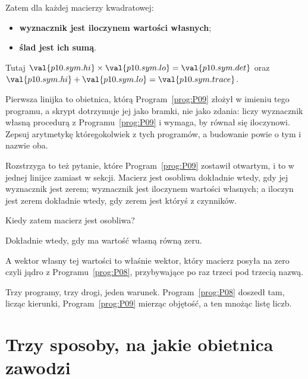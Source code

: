 \begin{fr}
Zatem dla każdej macierzy kwadratowej:

\begin{itemize}
\item \textbf{wyznacznik jest iloczynem wartości własnych};
\item \textbf{ślad jest ich sumą}.
\end{itemize}

Tutaj $\val{p10.sym.hi} \times \val{p10.sym.lo} = \val{p10.sym.det}$ oraz
$\val{p10.sym.hi} + \val{p10.sym.lo} = \val{p10.sym.trace}$.

Pierwsza linijka to obietnica, którą Program~\ref{prog:P09} złożył w imieniu
tego programu, a skrypt dotrzymuje jej jako bramki, nie jako zdania: liczy
wyznacznik własną procedurą z Programu~\ref{prog:P09} i wymaga, by równał się
iloczynowi. Zepsuj arytmetykę któregokolwiek z tych programów, a budowanie
powie o tym i nazwie oba.

Rozstrzyga to też pytanie, które Program~\ref{prog:P09} zostawił otwartym, i to
w jednej linijce zamiast w sekcji. Macierz jest osobliwa dokładnie wtedy, gdy
jej wyznacznik jest zerem; wyznacznik jest iloczynem wartości własnych; a
iloczyn jest zerem dokładnie wtedy, gdy zerem jest któryś z czynników.

Kiedy zatem macierz jest osobliwa?
\dotline
\nextframe
\end{fr}

\begin{fr}
\begin{ansblock}
Dokładnie wtedy, gdy ma wartość własną równą zeru.
\end{ansblock}

A wektor własny tej wartości to właśnie wektor, który macierz posyła na zero
\dash{} czyli jądro z Programu~\ref{prog:P08}, przybywające po raz trzeci pod
trzecią nazwą.

Trzy programy, trzy drogi, jeden warunek. Program~\ref{prog:P08} doszedł tam,
licząc kierunki, Program~\ref{prog:P09} mierząc objętość, a ten mnożąc listę
liczb.
\end{fr}

\section{Trzy sposoby, na jakie obietnica zawodzi}
\label{sec:P10-failures}

